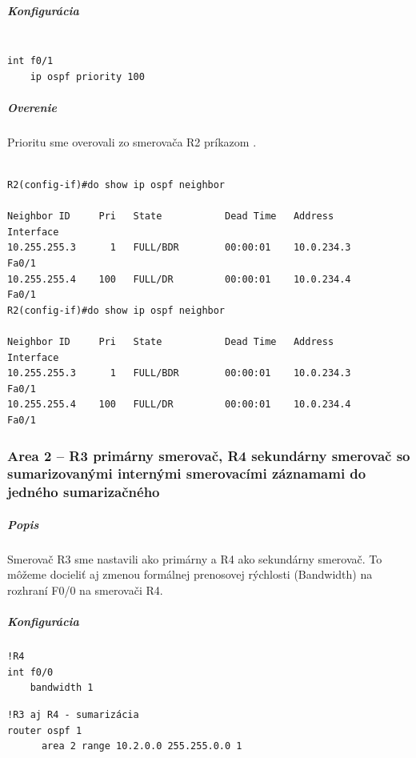 \documentclass[12pt,twoside,a4paper]{article}
\begin{document}
\subparagraph{Konfigurácia}
\noindent
{\selectfont
\begin{small}
\begin{verbatim}

int f0/1
    ip ospf priority 100

\end{verbatim}
\end{small}
}

\subparagraph{Overenie}
\subparagraph{}
Prioritu sme overovali zo smerovača R2 príkazom .

\noindent
{\selectfont
\begin{small}
\begin{verbatim}

R2(config-if)#do show ip ospf neighbor

Neighbor ID     Pri   State           Dead Time   Address         Interface
10.255.255.3      1   FULL/BDR        00:00:01    10.0.234.3      Fa0/1
10.255.255.4    100   FULL/DR         00:00:01    10.0.234.4      Fa0/1
R2(config-if)#do show ip ospf neighbor

Neighbor ID     Pri   State           Dead Time   Address         Interface
10.255.255.3      1   FULL/BDR        00:00:01    10.0.234.3      Fa0/1
10.255.255.4    100   FULL/DR         00:00:01    10.0.234.4      Fa0/1

\end{verbatim}
\end{small}
}




\subsubsection*{Area 2 – R3 primárny smerovač, R4 sekundárny smerovač so sumarizovanými internými smerovacími záznamami do jedného sumarizačného}
\subparagraph{Popis}
\subparagraph{}
Smerovač R3 sme nastavili ako primárny a R4 ako sekundárny smerovač. To môžeme docieliť aj zmenou formálnej prenosovej rýchlosti (Bandwidth) na rozhraní F0/0 na smerovači R4.

\subparagraph{Konfigurácia}
\noindent
{\selectfont
\begin{small}
\begin{verbatim}
!R4
int f0/0
    bandwidth 1

\end{verbatim}
\end{small}
}

\noindent
{\selectfont
\begin{small}
\begin{verbatim}
!R3 aj R4 - sumarizácia
router ospf 1
      area 2 range 10.2.0.0 255.255.0.0 1

\end{verbatim}
\end{small}
}
\end{document}
